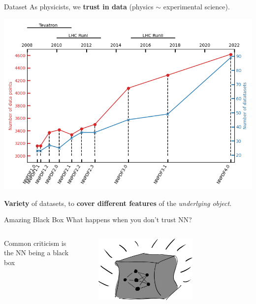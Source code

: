 \documentclass[9pt]{beamer}
\begin{document}
\begin{frame}{Dataset}
    \vspace*{5pt}
    As physicists, we \alert{\textbf{trust in data}} (physics $\sim$
    experimental science).
    \begin{center}
        \begin{tcolorbox}[width=0.65\textwidth]
            \includegraphics[width=\textwidth]{data}
        \end{tcolorbox}
    \end{center}
    \textbf{Variety} of datasets, to \textbf{cover different features} of the
    \textit{underlying object}.
\end{frame}

\begin{frame}{Amazing Black Box}
    What happens when you don't trust NN?
    \begin{columns}
        \begin{column}{0.5\textwidth}
            Common criticism is the NN being a black box
        \end{column}
        \begin{column}{0.5\textwidth}
            \begin{figure}
                \centering
                \includegraphics[width=0.7\textwidth]{black-box}
            \end{figure}
        \end{column}
    \end{columns}
\end{frame}
\end{document}
